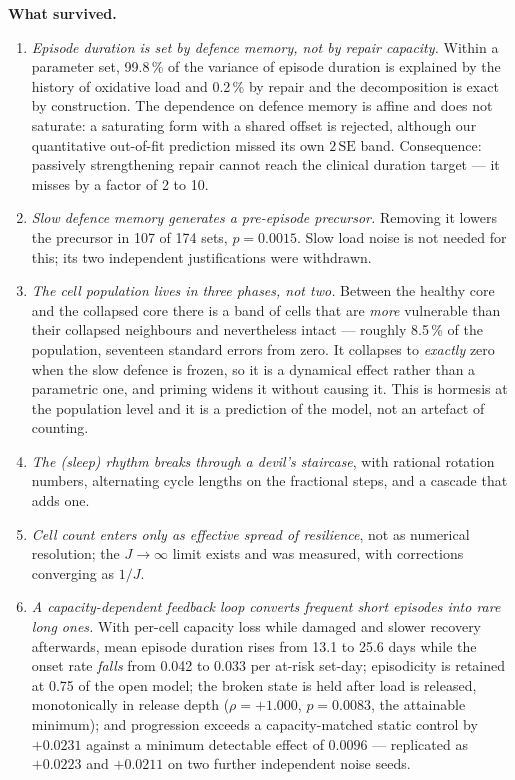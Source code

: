 \documentclass[11pt,a4paper]{article}
\begin{document}
\vspace{2pt}
\noindent\textbf{What survived.}
\begin{enumerate}
\item \emph{Episode duration is set by defence memory, not by repair capacity.} Within a parameter
set, 99.8\,\% of the variance of episode duration is explained by the history of oxidative load and
0.2\,\% by repair and the decomposition is exact by construction.
The dependence on defence memory is affine and does not saturate: a saturating form
with a shared offset is rejected, although our quantitative out-of-fit prediction missed its own
$2\,\mathrm{SE}$ band. Consequence: passively strengthening repair cannot reach the clinical
duration target --- it misses by a factor of 2 to 10.
\item \emph{Slow defence memory generates a pre-episode precursor.} Removing it lowers the
precursor in 107 of 174 sets, $p=0.0015$. Slow load noise is not needed for this; its two
independent justifications were withdrawn.
\item \emph{The cell population lives in three phases, not two.} Between the healthy core and the %
collapsed core there is a band of cells that are \emph{more} vulnerable than their collapsed
neighbours and nevertheless intact --- roughly 8.5\,\% of the population, seventeen standard
errors from zero. It collapses to \emph{exactly} zero when the slow defence is frozen, so it is a
dynamical effect rather than a parametric one, and priming widens it without causing it. This is
hormesis at the population level and it is a prediction of the model, not an artefact of counting.
\item \emph{The (sleep) rhythm breaks through a devil's staircase}, with rational rotation numbers,
alternating cycle lengths on the fractional steps, and a cascade that adds one.
\item \emph{Cell count enters only as effective spread of resilience}, not as numerical resolution;
the $J\to\infty$ limit exists and was measured, with corrections converging as $1/J$.
\item \emph{A capacity-dependent feedback loop converts frequent short episodes into rare long
ones.} With per-cell capacity loss while damaged and slower recovery afterwards, mean episode
duration rises from 13.1 to 25.6 days while the onset rate \emph{falls} from 0.042 to 0.033 per
at-risk set-day; episodicity is retained at 0.75 of the open model; the broken state is held after
load is released, monotonically in release depth ($\rho=+1.000$, $p=0.0083$, the attainable
minimum); and progression exceeds a capacity-matched static control by $+0.0231$ against a minimum
detectable effect of $0.0096$ --- replicated as $+0.0223$ and $+0.0211$ on two further independent
noise seeds.
\end{enumerate}
\end{document}
